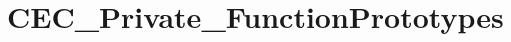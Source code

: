 \hypertarget{group___c_e_c___private___function_prototypes}{\section{C\-E\-C\-\_\-\-Private\-\_\-\-Function\-Prototypes}
\label{group___c_e_c___private___function_prototypes}
}

